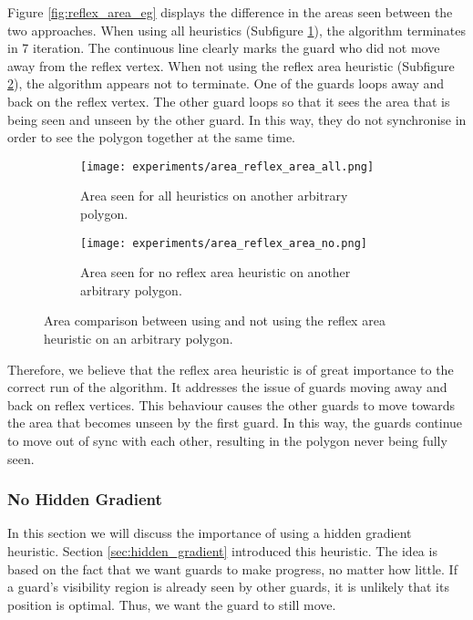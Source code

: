 Figure \ref{fig:reflex_area_eg} displays the difference in the areas seen between the two approaches. When using all heuristics (Subfigure \ref{fig:area_reflex_area_all}), the algorithm terminates in 7 iteration. The continuous line clearly marks the guard who did not move away from the reflex vertex. When not using the reflex area heuristic (Subfigure \ref{fig:area_reflex_area_no}), the algorithm appears not to terminate. One of the guards loops away and back on the reflex vertex. The other guard loops so that it sees the area that is being seen and unseen by the other guard. In this way, they do not synchronise in order to see the polygon together at the same time.

\begin{figure}[h!]
    \centering
    \begin{subfigure}{0.45\textwidth}
        \texttt{[image: experiments/area\_reflex\_area\_all.png]}
        \caption{Area seen for all heuristics on another arbitrary polygon.}
        \label{fig:area_reflex_area_all}
    \end{subfigure}
    \hfill
    \begin{subfigure}{0.45\textwidth}
        \texttt{[image: experiments/area\_reflex\_area\_no.png]}
        \caption{Area seen for no reflex area heuristic on another arbitrary polygon.}
        \label{fig:area_reflex_area_no}
    \end{subfigure}
    \caption{Area comparison between using and not using the reflex area heuristic on an arbitrary polygon.}
    \label{fig:area_reflex_area}
\end{figure}

Therefore, we believe that the reflex area heuristic is of great importance to the correct run of the algorithm. It addresses the issue of guards moving away and back on reflex vertices. This behaviour causes the other guards to move towards the area that becomes unseen by the first guard. In this way, the guards continue to move out of sync with each other, resulting in the polygon never being fully seen.

\subsubsection{No Hidden Gradient}
In this section we will discuss the importance of using a hidden gradient heuristic. Section \ref{sec:hidden_gradient} introduced this heuristic. The idea is based on the fact that we want guards to make progress, no matter how little. If a guard's visibility region is already seen by other guards, it is unlikely that its position is optimal. Thus, we want the guard to still move.

